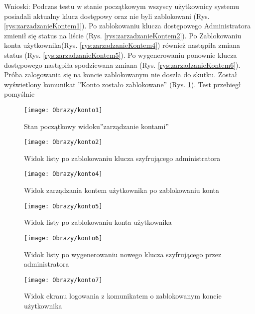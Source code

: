 \begin{enumerate*}
		Wnioski: Podczas testu w stanie początkowym wszyscy użytkownicy systemu posiadali aktualny klucz dostępowy oraz nie byli zablokowani (Rys. \ref{rys:zarzadzanieKontem1}). Po zablokowaniu klucza dostępowego  Administratora zmienił się status na liście (Rys. \ref{rys:zarzadzanieKontem2}). Po Zablokowaniu konta użytkownika(Rys. \ref{rys:zarzadzanieKontem4}) również nastąpiła zmiana  status  (Rys. \ref{rys:zarzadzanieKontem5}). Po wygenerowaniu ponownie klucza dostępowego nastąpiła spodziewana zmiana (Rys. \ref{rys:zarzadzanieKontem6}). Próba zalogowania się na koncie zablokowanym nie doszła do skutku. Został wyświetlony komunikat ''Konto zostało zablokowane'' (Rys. \ref{rys:zarzadzanieKontem7}). Test przebiegł pomyślnie
		
		
				\begin{figure}[ht!]
					\begin{minipage}{0.2\textwidth}
						\texttt{[image: Obrazy/konto1]}
						\caption{Stan początkowy widoku''zarządzanie kontami'' }
						\label{rys:zarzadzanieKontem1}
					\end{minipage}
				\begin{minipage}{0.2\textwidth}
					\texttt{[image: Obrazy/konto2]}
					\caption{Widok listy po zablokowaniu klucza szyfrującego administratora }
					\label{rys:zarzadzanieKontem2}
				\end{minipage}
			
		
			
			\begin{minipage}{0.2\textwidth}
				\texttt{[image: Obrazy/konto4]}
				\caption{Widok zarządzania kontem użytkownika po zablokowaniu konta }
				\label{rys:zarzadzanieKontem4}
			\end{minipage}
			
			
			\begin{minipage}{0.2\textwidth}
				\texttt{[image: Obrazy/konto5]}
				\caption{Widok listy po zablokowaniu konta użytkownika}
				\label{rys:zarzadzanieKontem5}
			\end{minipage}
		
		
			\begin{minipage}{0.2\textwidth}
			\texttt{[image: Obrazy/konto6]}
			\caption{Widok listy po wygenerowaniu nowego klucza szyfrującego przez administratora}
			\label{rys:zarzadzanieKontem6}
		\end{minipage}
	
		\begin{minipage}{0.2\textwidth}
		\texttt{[image: Obrazy/konto7]}
		\caption{Widok ekranu logowania z komunikatem o zablokowanym koncie użytkownika}
		\label{rys:zarzadzanieKontem7}
	\end{minipage}


\end{figure}
\end{enumerate*}
